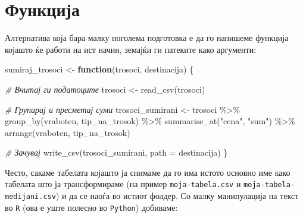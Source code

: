\documentclass[
]{book}
\newenvironment{Shaded}{\begin{snugshade}}{\end{snugshade}}
\newcommand{\AttributeTok}[1]{\textcolor[rgb]{0.77,0.63,0.00}{#1}}
\newcommand{\CommentTok}[1]{\textcolor[rgb]{0.56,0.35,0.01}{\textit{#1}}}
\newcommand{\ControlFlowTok}[1]{\textcolor[rgb]{0.13,0.29,0.53}{\textbf{#1}}}
\newcommand{\FunctionTok}[1]{\textcolor[rgb]{0.00,0.00,0.00}{#1}}
\newcommand{\NormalTok}[1]{#1}
\newcommand{\OtherTok}[1]{\textcolor[rgb]{0.56,0.35,0.01}{#1}}
\newcommand{\SpecialCharTok}[1]{\textcolor[rgb]{0.00,0.00,0.00}{#1}}
\newcommand{\StringTok}[1]{\textcolor[rgb]{0.31,0.60,0.02}{#1}}
\begin{document}
\hypertarget{ux444ux443ux43dux43aux446ux438ux458ux430}{%
\section{Функција}\label{ux444ux443ux43dux43aux446ux438ux458ux430}}

Алтернатива која бара малку поголема подготовка е да го напишеме функција којашто ќе работи на ист начин, земајќи ги патеките како аргументи:

\begin{Shaded}
\begin{Highlighting}[]
\NormalTok{sumiraj\_trosoci }\OtherTok{\textless{}{-}} \ControlFlowTok{function}\NormalTok{(trosoci, destinacija) \{}
  
  \CommentTok{\# Вчитај ги податоците}
\NormalTok{  trosoci }\OtherTok{\textless{}{-}} \FunctionTok{read\_csv}\NormalTok{(trosoci)}
  
  \CommentTok{\# Групирај и пресметај суми}
\NormalTok{  trosoci\_sumirani }\OtherTok{\textless{}{-}}\NormalTok{ trosoci }\SpecialCharTok{\%\textgreater{}\%}
    \FunctionTok{group\_by}\NormalTok{(vraboten, tip\_na\_trosok) }\SpecialCharTok{\%\textgreater{}\%}
    \FunctionTok{summarise\_at}\NormalTok{(}\StringTok{"cena"}\NormalTok{, }\StringTok{"sum"}\NormalTok{) }\SpecialCharTok{\%\textgreater{}\%} 
  \FunctionTok{arrange}\NormalTok{(vraboten, tip\_na\_trosok)}
  
  \CommentTok{\# Зачувај}
  \FunctionTok{write\_csv}\NormalTok{(trosoci\_sumirani,}
            \AttributeTok{path =}\NormalTok{ destinacija)}
\NormalTok{\}}
\end{Highlighting}
\end{Shaded}

Често, сакаме табелата којашто ја снимаме да го има истото основно име како табелата што ја трансформираме (на пример \texttt{moja-tabela.csv} и \texttt{moja-tabela-medijani.csv}) и да се наоѓа во истиот фолдер. Со малку манипулација на текст во \texttt{R} (ова е уште полесно во \texttt{Python}) добиваме:
\end{document}
